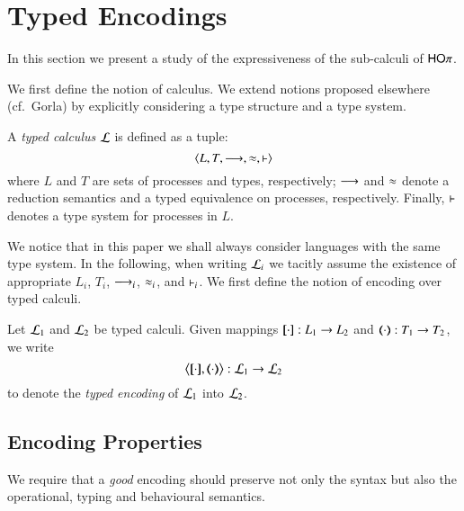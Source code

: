 
\newpage
\section{Typed Encodings}\label{s:expr}

In this section we present a study of the expressiveness 
of the sub-calculi of $\mathsf{HO}\pi$.

We first define the notion of calculus.
We extend notions proposed elsewhere (cf.~Gorla\cite{})
by explicitly considering a type structure and a type system.

\begin{definition}\label{d:tcalculus}\rm
	A \emph{typed calculus} $\mathcal{L}$ is defined as a tuple:
%
	\[
		\langle L, T, \longrightarrow, \approx, \vdash \rangle
	\]
%
	where $L$ and $T$ are sets of processes and types, respectively; %
	$\longrightarrow$ and $\approx$ denote a reduction semantics 
	and a typed equivalence
	on processes, respectively. Finally, $\vdash$ denotes a type system for processes in $L$.
\end{definition}

We notice that in this paper we shall always consider languages with the same type system.
In the following, when writing $\mathcal{L}_i$ we tacitly assume the existence of appropriate 
$L_i$, $T_i$, $\longrightarrow_i$, $\approx_i$, and $\vdash_i$.
We first define the notion of encoding over typed calculi.

\begin{definition}\rm
	Let  $\mathcal{L}_1$ %
	and $\mathcal{L}_2$ %
	be typed calculi.%
	Given mappings $[\!\![\cdot]\!\!]: L_1 \to L_2$ and
	$(\!\!\langle\cdot\rangle\!\!): T_1 \to T_2$, 
	we write 
	\[
		\enc{\cdot}{\cdot} : \tyl{L}_1 \to \tyl{L}_2
	\]
	to denote the \emph{typed encoding} of $\mathcal{L}_1$ into $\mathcal{L}_2$.
\end{definition}

\subsection{Encoding Properties}

We require that a {\em good} encoding should 
preserve not only the syntax but
also the operational, typing and behavioural
semantics. 

